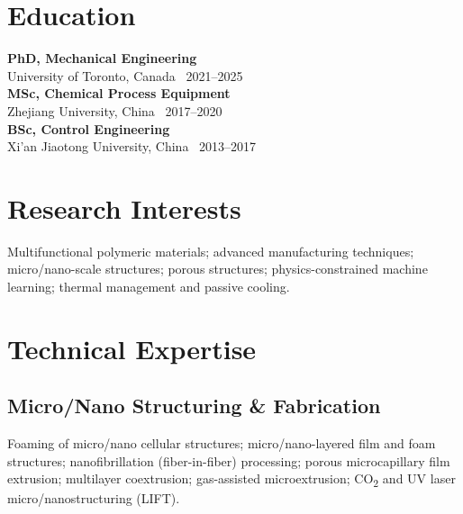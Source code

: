 \documentclass[12pt]{article}
\begin{document}

\section{Education}
\textbf{PhD, Mechanical Engineering} \\
University of Toronto, Canada \textbar\ 2021--2025 \\
\textbf{MSc, Chemical Process Equipment} \\
Zhejiang University, China \textbar\ 2017--2020 \\
\textbf{BSc, Control Engineering} \\
Xi'an Jiaotong University, China \textbar\ 2013--2017

\section{Research Interests}
Multifunctional polymeric materials; advanced manufacturing techniques; micro/nano-scale structures; porous structures; physics-constrained machine learning; thermal management and passive cooling.

\section{Technical Expertise}

\subsection{Micro/Nano Structuring \& Fabrication}
Foaming of micro/nano cellular structures; micro/nano-layered film and foam structures; nanofibrillation (fiber-in-fiber) processing; porous microcapillary film extrusion; multilayer coextrusion; gas-assisted microextrusion; CO\textsubscript{2} and UV laser micro/nanostructuring (LIFT).
\end{document}
